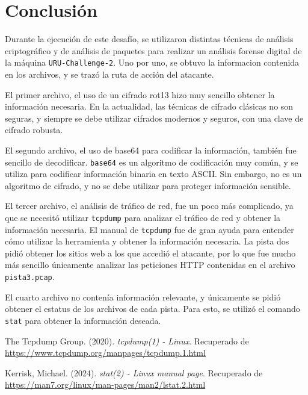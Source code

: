 \documentclass{article}
\begin{document}
\section{Conclusión}

Durante la ejecución de este desafío, se utilizaron distintas técnicas de análisis criptográfico y de análisis de paquetes para realizar un análisis forense digital de la máquina \texttt{URU-Challenge-2}. Uno por uno, se obtuvo la informacion contenida en los archivos, y se trazó la ruta de acción del atacante.

El primer archivo, el uso de un cifrado rot13 hizo muy sencillo obtener la información necesaria. En la actualidad, las técnicas de cifrado clásicas no son seguras, y siempre se debe utilizar cifrados modernos y seguros, con una clave de cifrado robusta.

El segundo archivo, el uso de base64 para codificar la información, también fue sencillo de decodificar. \texttt{base64} es un algoritmo de codificación muy común, y se utiliza para codificar información binaria en texto ASCII. Sin embargo, no es un algoritmo de cifrado, y no se debe utilizar para proteger información sensible.

El tercer archivo, el análisis de tráfico de red, fue un poco más complicado, ya que se necesitó utilizar \texttt{tcpdump} para analizar el tráfico de red y obtener la información necesaria. El manual de \texttt{tcpdump} \cite{thetcpdumpgroup_2020_tcpdump1} fue de gran ayuda para entender cómo utilizar la herramienta y obtener la información necesaria. La pista dos pidió obtener los sitios web a los que accedió el atacante, por lo que fue mucho más sencillo únicamente analizar las peticiones HTTP contenidas en el archivo \texttt{pista3.pcap}.

El cuarto archivo no contenía información relevante, y únicamente se pidió obtener el estatus de los archivos de cada pista. Para esto, se utilizó el comando \texttt{stat} \cite{kerrisk_2024_stat2} para obtener la información deseada.


\begin{thebibliography}{widestlabel}
  The Tcpdump Group. (2020). \textit{tcpdump(1) - Linux}. Recuperado de \url{https://www.tcpdump.org/manpages/tcpdump.1.html}

  Kerrisk, Michael. (2024). \textit{stat(2) - Linux manual page}. Recuperado de
  \url{https://man7.org/linux/man-pages/man2/lstat.2.html}




\end{thebibliography}
\end{document}
